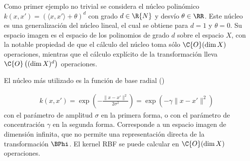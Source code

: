 Como primer ejemplo no trivial se considera el núcleo polinómico
$k(x,x')=\left(\langle{}x,x'\rangle+\theta\right)^d$ con grado
$d\in\R{N}$ y desvío $\theta\in\RR$. Este núcleo es una generalización
del núcleo lineal, el cual se obtiene para $d=1$ y $\theta=0$. Su
espacio imagen es el espacio de los polinomios de grado
$d$ sobre el espacio $X$, con la notable propiedad de que
el cálculo del núcleo toma sólo $\C{O}(\dim{}X)$ operaciones,
mientras que el cálculo explícito de la transformación
lleva 
$\C{O}\left((\dim{}X)^d\right)$ operaciones.

El núcleo más utilizado es la función de base radial
()

\begin{align}
  k(x,x')=\exp\left(-\frac{\|x-x'\|^2}{2\sigma^2}\right)
  =\exp\left(-\gamma\|x-x'\|^2\right)
\end{align}
con el parámetro de amplitud $\sigma$ en la primera forma, o con el
parámetro de concentración $\gamma$ en la segunda forma. Corresponde
a un espacio imagen de dimensión infinita, que no permite
una representación directa de la transformación $\BPhi$.
El kernel RBF se puede calcular
en $\C{O}(\dim{}X)$ operaciones.
